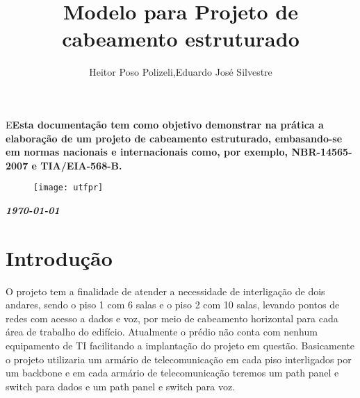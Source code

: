 \documentclass[	DIV=calc,%
							paper=a4,%
							fontsize=12pt,%
							onecolumn]{scrartcl}	 					%
\title{Modelo para Projeto de cabeamento estruturado}					%
\author{Heitor Poso Polizeli,Eduardo José Silvestre}  	%
\date{}																				%
\newcommand{\initial}[1]{%
     \lettrine[lines=3,lhang=0.3,nindent=0em]{
     				\color{DarkGoldenrod}
     				{\textsf{#1}}}{}}
\begin{document}
\maketitle
\thispagestyle{fancy} 	
\thispagestyle{empty}		%




\initial{E}\textbf{Esta documentação tem como objetivo demonstrar na prática a elaboração de um projeto
	de cabeamento estruturado, embasando-se em normas nacionais e internacionais como,
	por exemplo, NBR-14565-2007 e TIA/EIA-568-B.}

\begin{figure}
	\centering
	\texttt{[image: utfpr]}
\end{figure}

\vspace{3cm}
\centerline{\textit{\textbf{\today}}}

\clearpage
    \renewcommand*\listfigurename{Lista de figuras}
\listoffigures

\renewcommand*\listtablename{Lista de tabelas}
\listoftables




\clearpage
\renewcommand{\contentsname}{Sumário}
\tableofcontents
\clearpage

\section{Introdução}
  O projeto tem a finalidade de atender a necessidade de interligação de dois andares, sendo
  o piso 1 com 6 salas e o piso 2 com 10 salas, levando pontos de redes com acesso a dados e
  voz, por meio de cabeamento horizontal para cada área de trabalho do edifício. Atualmente
  o prédio  não conta com nenhum equipamento de TI facilitando a implantação do projeto
  em questão. Basicamente o projeto utilizaria um armário de telecomunicação em cada piso interligados por um backbone e em cada armário de telecomunicação teremos um path panel e switch para dados e um path panel e switch para voz. 
  
\end{document}
